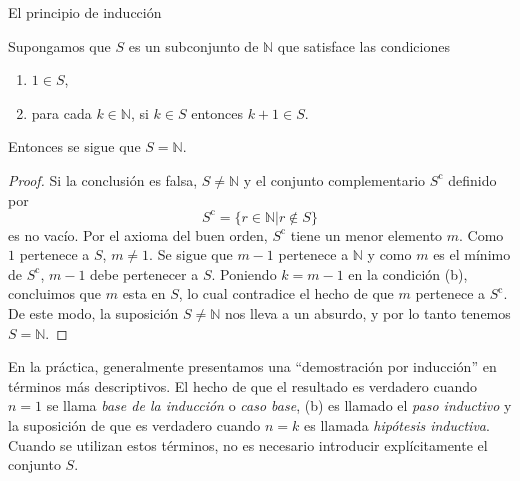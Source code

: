 \begin{section}{El principio de inducción}
\begin{teorema}\label{t1.4} Supongamos que $S$ es un subconjunto de $\mathbb N$ que satisface las condiciones 
\begin{enumerate}
\item $1 \in S$,
\item para cada $k \in \mathbb N$, si $ k \in S$ entonces $k+1\in S$.
\end{enumerate}
Entonces se sigue que $S=\mathbb N$.
\end{teorema}
\begin{proof}Si la conclusión es falsa, $S \not= \mathbb N$ y
el conjunto complementario $S^{\text{c}}$ definido por
$$
S^{\text{c}}= \{ r \in \mathbb N | r\not\in S\}
$$
 es no vacío. Por el axioma del buen orden, $S^{\text{c}}$ tiene un menor elemento $m$. Como $1$ pertenece a $S$, $m\not=1$. Se sigue que $m-1$ pertenece a $\mathbb N$ y como $m$ es el mínimo de $S^{\text{c}}$, $m-1$ debe pertenecer a $S$. Poniendo $k=m-1$ en la condición (b), concluimos que $m$ esta en $S$, lo cual contradice el hecho de que $m$ pertenece a $S^{\text{c}}$. De este modo, la suposición $S \not= \mathbb N$ nos lleva a un absurdo, y por lo tanto tenemos $S= \mathbb N$. 
 \end{proof}

En la práctica, generalmente presentamos una ``demostración por inducción'' en términos más descriptivos. El hecho de que el resultado es verdadero cuando $n=1$ se llama \textit{base de la inducción} o \textit{caso base}, (b) es llamado  el {\em paso inductivo} y la suposición de que es verdadero cuando $n=k$ es llamada \textit{hipótesis inductiva}. Cuando se utilizan estos términos, no es necesario introducir explícitamente el conjunto $S$.



\end{section}
